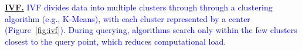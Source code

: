 \documentclass[sigconf, nonacm]{acmart}
\begin{document}
{%
%	
%	
	
	
	\noindent\textbf{\underline{IVF.}} 
	\textcolor{blue}{IVF divides data into multiple clusters through through a clustering algorithm (e.g., K-Means), with each cluster represented by a center (Figure~\ref{fig:ivf}). During querying, algorithms search only within the few clusters closest to the query point, which reduces computational load.}
	
}
\end{document}
